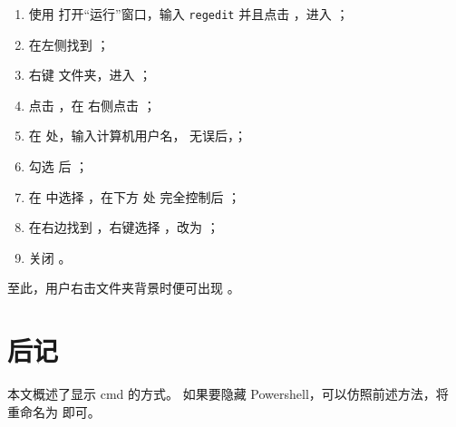 \documentclass{ctexart}
\begin{document}
\begin{enumerate}
  \item 使用  打开“运行”窗口，输入 \texttt{regedit} 并且点击 ，进入 ；
  \item 在左侧找到 ；
  \item 右键  文件夹，进入 ；
  \item 点击 ，在  右侧点击 ；
  \item 在  处，输入计算机用户名， 无误后，；
  \item 勾选  后 ；
  \item 在  中选择 ，在下方  处  完全控制后 ；
  \item 在右边找到 ，右键选择 ，改为 ；
  \item 关闭 。
\end{enumerate}
至此，用户右击文件夹背景时便可出现 。

\section{后记}

本文概述了显示 \textsf{cmd} 的方式。
如果要隐藏 \textsf{Powershell}，可以仿照前述方法，将  重命名为  即可。
\end{document}
